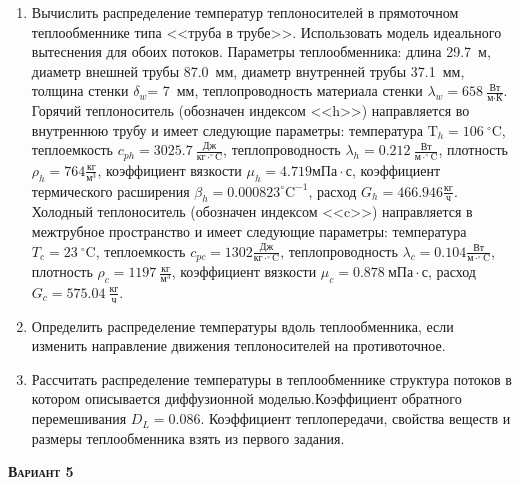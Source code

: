 \begin{enumerate} 
\item Вычислить распределение температур теплоносителей в прямоточном теплообменнике типа <<труба в трубе>>. Использовать модель идеального вытеснения для обоих потоков. Параметры теплообменника: длина  29.7~м, диаметр внешней трубы 87.0~мм,  диаметр внутренней трубы 37.1~мм, толщина стенки $\delta_{w}$=     7~мм,  теплопроводность материала стенки $\lambda_{w}=  658~\frac{\text{Вт}}{\text{м} \cdot \text{К}}$.  Горячий теплоноситель (обозначен индексом <<h>>) направляется во внутреннюю трубу и	 имеет следующие параметры: температура $\text{T}_{h}= 106~^\circ\mathrm{C}$, теплоемкость	  $c_{p{h}}= 3025.7~\frac{\text{Дж}}{\text{кг} \cdot ^\circ\mathrm{C}}$, теплопроводность 		$\lambda_{h}= 0.212~\frac{\text{Вт}}{\text{м} \cdot ^\circ\mathrm{C}}$, плотность 		$\rho_{h}=  764 \frac{\text{кг}}{\text{м}^3}$, коэффициент вязкости $\mu_{h}=4.719 \text{мПа} 		\cdot \text{с} $, коэффициент термического расширения $\beta_{h}=0.000823 ^\circ\mathrm{C}^{-1}$,		 расход $G_{h}= 466.946 \frac{\text{кг}}{\text{ч}}$. Холодный теплоноситель (обозначен индексом <<c>>) 		 направляется в межтрубное пространство и имеет следующие параметры: температура $T_{c}=   23		 ~^\circ\mathrm{C}$, теплоемкость $c_{p{c}}= 1302 \frac{\text{Дж}}{\text{кг} \cdot ^\circ\mathrm{C}}$,			 теплопроводность $\lambda_{c}=0.104 \frac{\text{Вт}}{\text{м} \cdot ^\circ\mathrm{C}}$, плотность 			 $\rho_{c}=  1197~\frac{\text{кг}}{\text{м}^3}$, коэффициент вязкости $\mu_{c}=0.878~\text{мПа} \cdot \text{с} $, 			 расход $G_{c}=575.04~\frac{\text{кг}}{\text{ч}}$. 

\item Определить распределение температуры вдоль теплообменника, если 	изменить направление движения теплоносителей на противоточное.

\item Рассчитать распределение температуры в теплообменнике структура потоков в котором описывается диффузионной моделью.Коэффициент обратного перемешивания $D_L = $0.086. Коэффициент теплопередачи, свойства веществ и размеры теплообменника взять из первого задания. 

\end{enumerate}

\textsc{\textbf{Вариант 5}}

